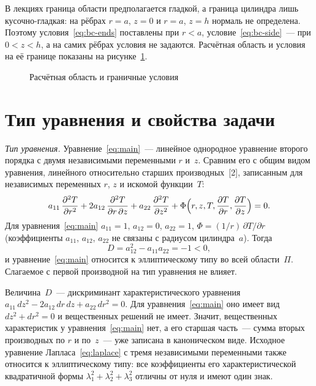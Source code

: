 В лекциях граница области предполагается гладкой, а граница цилиндра лишь
кусочно-гладкая: на рёбрах $r=a$, $z=0$ и $r=a$, $z=h$ нормаль не
определена. Поэтому условия~\eqref{eq:bc-ends} поставлены при $r<a$,
условие~\eqref{eq:bc-side}~— при $0<z<h$, а на самих рёбрах условия не
задаются. Расчётная область и условия на её границе показаны на
рисунке~\ref{fig:domain}.

\begin{figure}[H]
  \centering
  
  \caption{Расчётная область и граничные условия}
  \label{fig:domain}
\end{figure}

\section{Тип уравнения и свойства задачи}
\label{sec:type}

\emph{Тип уравнения.} Уравнение~\eqref{eq:main}~— линейное однородное
уравнение второго порядка с двумя независимыми переменными $r$ и~$z$.
Сравним его с общим видом уравнения, линейного относительно старших
производных~[2], записанным для независимых переменных $r$, $z$ и искомой
функции~$T$:
\begin{equation}
\label{eq:general}
a_{11}\,\dfrac{\partial^2 T}{\partial r^2}+2a_{12}\,\frac{\partial^2 T}{\partial r\,\partial z}
+a_{22}\,\dfrac{\partial^2 T}{\partial z^2}+\Phi\Bigl(r,z,T,\dfrac{\partial T}{\partial r},\dfrac{\partial T}{\partial z}\Bigr)=0 .
\end{equation}
Для уравнения~\eqref{eq:main} $a_{11}=1$, $a_{12}=0$, $a_{22}=1$,
$\Phi=(1/r)\,\partial T/\partial r$ (коэффициенты $a_{11}$, $a_{12}$,
$a_{22}$ не связаны с радиусом цилиндра~$a$). Тогда
\begin{equation}
\label{eq:discr}
D=a_{12}^2-a_{11}a_{22}=-1<0,
\end{equation}
и уравнение~\eqref{eq:main} относится к эллиптическому типу во всей
области~$\Pi$. Слагаемое с первой производной на тип уравнения не влияет.

Величина~$D$~— дискриминант характеристического уравнения
$a_{11}\,dz^2-2a_{12}\,dr\,dz+a_{22}\,dr^2=0$. Для
уравнения~\eqref{eq:main} оно имеет вид $dz^2+dr^2=0$ и вещественных решений
не имеет. Значит, вещественных характеристик у уравнения~\eqref{eq:main}
нет, а его старшая часть~— сумма вторых производных по $r$ и по~$z$~— уже
записана в каноническом виде. Исходное уравнение Лапласа~\eqref{eq:laplace}
с тремя независимыми переменными также относится к эллиптическому типу: все
коэффициенты его характеристической квадратичной формы
$\lambda_1^2+\lambda_2^2+\lambda_3^2$ отличны от нуля и имеют один знак.

